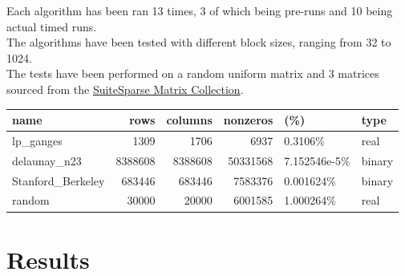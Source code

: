 \documentclass{article}
\begin{document}
Each algorithm has been ran 13 times, 3 of which being pre-runs and 10 being actual timed runs.\\
The algorithms have been tested with different block sizes, ranging from 32 to 1024.\\
The tests have been performed on a random uniform matrix and 3 matrices sourced from the \href{https://sparse.tamu.edu/}{SuiteSparse Matrix Collection}.
\begin{center}
    \begin{tabular}{l|r|r|rl|l}
        name & rows & columns & nonzeros & (\%) & type \\
        \hline
        lp\_ganges\footnotemark & 1309 & 1706 & 6937 & 0.3106\% & real \\
        delaunay\_n23\footnotemark & 8388608 & 8388608 & 50331568 & 7.152546e-5\% & binary \\
        Stanford\_Berkeley\footnotemark & 683446 & 683446 & 7583376 & 0.001624\% & binary \\
        random & 30000 & 20000 & 6001585 & 1.000264\% & real \\
    \end{tabular}
\end{center}

\section{Results}
\end{document}
